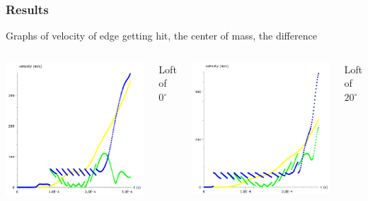 \documentclass{beamer}
\begin{document}
\begin{frame}
\frametitle{Results}

Graphs of velocity of {\color{blue} edge getting hit}, {\color{yellow} the center of mass}, {\color{green} the dif\mbox{f}erence}

\begin{columns}
\includegraphics[width = 1.0\textwidth]{loft0}
\begin{center}\scriptsize Loft of $0^{\circ}$ \end{center}

\includegraphics[width = 1.0\textwidth]{loft20}
\begin{center}\scriptsize Loft of $20^{\circ}$   \end{center}


\end{columns}
\end{frame}
\end{document}
